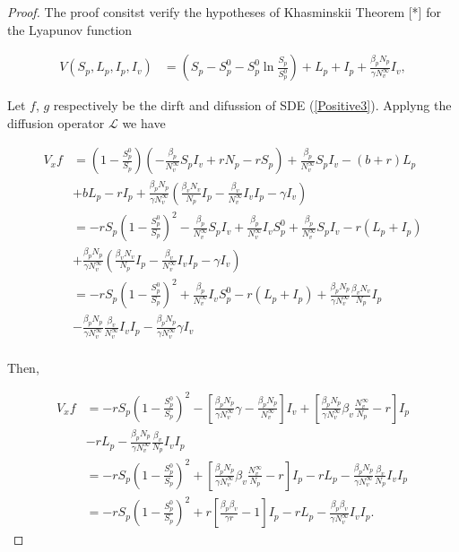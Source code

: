 \begin{proof}
	The proof consitst verify the hypotheses of Khasminskii Theorem [*] for the Lyapunov function
	
	\begin{align*}
		V(S_p,L_p,I_p,I_v) &= 
			\left(S_p-S_p^0-S_p^0\ln\frac{S_p}{S_p^0}\right)+L_p+I_p+\frac{\beta_p N_p}{\gamma N^\infty_v}I_v,
	\end{align*}
	
	Let $f$, $g$ respectively be the dirft and difussion of SDE (\ref{Positive3}).	Applyng the diffusion operator $\mathcal{L}$ we have
	
	\begin{align*}
		V_x f &=
				\left(1-\frac{S_p^0}{S_p}\right)\left(-\frac{\beta_p}{N^\infty_v}S_pI_v+ rN_p-r S_p\right)+\frac{\beta_p}{N^\infty_v}S_pI_v-(b+r)L_p\\
			  &+
				bL_p-rI_p+\frac{\beta_p N_p}{\gamma N^\infty_v}\left(\frac{\beta_v N_v}{N_p}I_p-\frac{\beta_v}{N_v^\infty}I_vI_p-\gamma I_v\right)\\
			  &=
			  	-rS_p\left(1-\frac{S_p^0}{S_p}\right)^2-\frac{\beta_p}{N_v^\infty}S_pI_v+\frac{\beta_p}{N_v^\infty}I_vS_p^0+\frac{\beta_p}{N_v^\infty}S_pI_v-r(L_p+I_p)\\
			  &+
			  	\frac{\beta_p N_p}{\gamma N^\infty_v}\left(\frac{\beta_v N_v}{N_p}I_p-\frac{\beta_v}{N_v^\infty}I_vI_p-\gamma I_v\right)\\
			  &=
			  	-rS_p\left(1-\frac{S_p^0}{S_p}\right)^2+\frac{\beta_p}{N_v^\infty}I_vS_p^0-r(L_p+I_p)+\frac{\beta_p N_p}{\gamma N^\infty_v}\frac{\beta_v N_v}{N_p}I_p\\
			  &-	
			  	\frac{\beta_p N_p}{\gamma N^\infty_v}\frac{\beta_v}{N_v^\infty}I_vI_p-\frac{\beta_p N_p}{\gamma N^\infty_v}\gamma I_v\\
	\end{align*}
	
	Then,
	
	\begin{align*}
		V_x f &=
				-rS_p\left(1-\frac{S_p^0}{S_p}\right)^2-\left[\frac{\beta_p N_p}{\gamma N^\infty_v}\gamma-\frac{\beta_p N_p}{N_v^\infty}\right]I_v+\left[\frac{\beta_p N_p}{\gamma N^\infty_v}\beta_v\frac{N_v^\infty}{N_p}-r\right]I_p\\
		 	  &-
				rL_p-\frac{\beta_p N_p}{\gamma N^\infty_v}\frac{\beta_v}{N_p}I_vI_p\\
			  &=
			  	-rS_p\left(1-\frac{S_p^0}{S_p}\right)^2 + \left[\frac{\beta_p N_p}{\gamma N^\infty_v}\beta_v\frac{N_v^\infty}{N_p}-r\right]I_p-rL_p-\frac{\beta_p N_p}{\gamma N^\infty_v}\frac{\beta_v}{N_p}I_vI_p\\
			  &=
			  	-rS_p\left(1-\frac{S_p^0}{S_p}\right)^2 + r\left[\frac{\beta_p\beta_v}{\gamma r}-1\right]I_p-rL_p-\frac{\beta_p\beta_v}{\gamma N^\infty_v}I_vI_p.
	\end{align*}
	

\end{proof}
